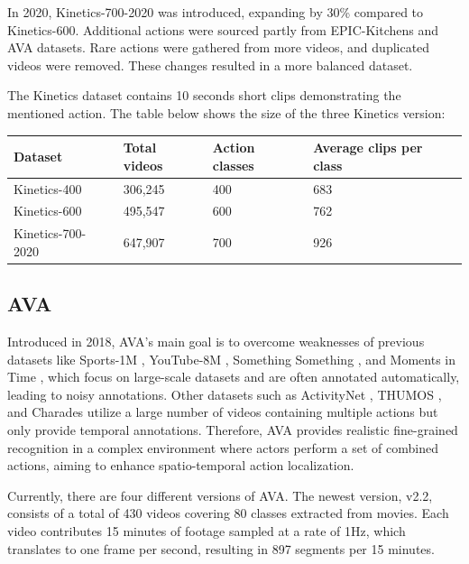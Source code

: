 \documentclass[a4paper]{article}
\begin{document}
In 2020, Kinetics-700-2020 was introduced, expanding by 30\% compared to Kinetics-600. Additional actions were sourced partly from EPIC-Kitchens and AVA datasets. Rare actions were gathered from more videos, and duplicated videos were removed. These changes resulted in a more balanced dataset.

The Kinetics dataset contains 10 seconds short clips demonstrating the mentioned action. The table below shows the size of the three Kinetics version:
\begin{center}
	\begin{tabular}{| l | l | l | l |}
		\hline
		Dataset & Total videos & Action classes & Average clips per class \\ \hline
		Kinetics-400 & 306,245 & 400 & 683\\ \hline
		Kinetics-600 & 495,547 & 600 & 762\\ \hline
		Kinetics-700-2020 & 647,907 & 700 &  926\\ \hline
	\end{tabular}
\end{center}

\subsection{AVA}
Introduced in 2018, AVA's \cite{AVA} main goal is to overcome weaknesses of previous datasets like Sports-1M \cite{Sports1M}, YouTube-8M \cite{YouTube8M}, Something Something \cite{somethingsomething}, and Moments in Time \cite{momentsintime}, which focus on large-scale datasets and are often annotated automatically, leading to noisy annotations. Other datasets such as ActivityNet \cite{ActivityNet}, THUMOS \cite{THUMOS}, and Charades utilize a large number of videos containing multiple actions but only provide temporal annotations. Therefore, AVA provides realistic fine-grained recognition in a complex environment where actors perform a set of combined actions, aiming to enhance spatio-temporal action localization.

Currently, there are four different versions of AVA. The newest version, v2.2, consists of a total of 430 videos covering 80 classes extracted from movies. Each video contributes 15 minutes of footage sampled at a rate of 1Hz, which translates to one frame per second, resulting in 897 segments per 15 minutes.
\end{document}

